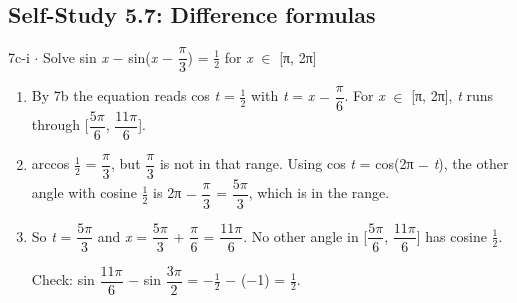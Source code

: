 \documentclass[11pt]{article}
\begin{document}
\begin{keepsection}\subsection{Self-Study 5.7: Difference formulas}

\begin{workedbox}{7c-i \ensuremath{\cdot} Solve sin \textit{x} \ensuremath{-} sin(\textit{x} \ensuremath{-} {\small\ensuremath{\dfrac{π}{3}}}) = \ensuremath{\tfrac12} for \textit{x} \ensuremath{\in} [π, 2π]}
\begin{enumerate}
\item By 7b the equation reads cos \textit{t} = \ensuremath{\tfrac12} with \textit{t} = \textit{x} \ensuremath{-} {\small\ensuremath{\dfrac{π}{6}}}. For \textit{x} \ensuremath{\in} [π, 2π], \textit{t} runs through [{\small\ensuremath{\dfrac{5π}{6}}}, {\small\ensuremath{\dfrac{11π}{6}}}].
\item arccos \ensuremath{\tfrac12} = {\small\ensuremath{\dfrac{π}{3}}}, but {\small\ensuremath{\dfrac{π}{3}}} is not in that range. Using cos \textit{t} = cos(2π \ensuremath{-} \textit{t}), the other angle with cosine \ensuremath{\tfrac12} is 2π \ensuremath{-} {\small\ensuremath{\dfrac{π}{3}}} = {\small\ensuremath{\dfrac{5π}{3}}}, which is in the range.
\item {}
So \textit{t} = {\small\ensuremath{\dfrac{5π}{3}}} and \textit{x} = {\small\ensuremath{\dfrac{5π}{3}}} + {\small\ensuremath{\dfrac{π}{6}}} = {\small\ensuremath{\dfrac{11π}{6}}}. No other angle in [{\small\ensuremath{\dfrac{5π}{6}}}, {\small\ensuremath{\dfrac{11π}{6}}}] has cosine \ensuremath{\tfrac12}.

Check: sin {\small\ensuremath{\dfrac{11π}{6}}} \ensuremath{-} sin {\small\ensuremath{\dfrac{3π}{2}}} = \ensuremath{-}\ensuremath{\tfrac12} \ensuremath{-} (\ensuremath{-}1) = \ensuremath{\tfrac12}.
\end{enumerate}
\end{workedbox}

\end{keepsection}
\end{document}
